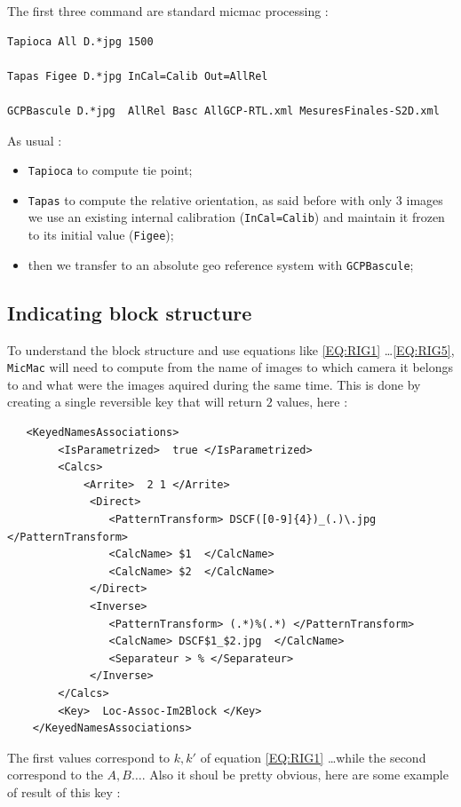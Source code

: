 The first three command are standard micmac processing :

\begin{verbatim}
Tapioca All D.*jpg 1500

Tapas Figee D.*jpg InCal=Calib Out=AllRel

GCPBascule D.*jpg  AllRel Basc AllGCP-RTL.xml MesuresFinales-S2D.xml
\end{verbatim}

As usual :

\begin{itemize}
    \item {\tt Tapioca} to compute tie point;
    \item {\tt Tapas} to compute the relative orientation, as said before with only $3$ images we use an existing internal
          calibration ({\tt InCal=Calib}) and maintain it frozen to its initial value ({\tt Figee});
    \item then we transfer to an absolute geo reference system with {\tt GCPBascule};
\end{itemize}

\subsection{Indicating block structure}

To understand the block structure and use equations like  \ref{EQ:RIG1} \dots \ref{EQ:RIG5}, 
{\tt MicMac} will need to compute from the name of images to which camera it belongs to and 
what were the images aquired during the same time. This is done by creating a single reversible key
that will return $2$ values, here :

\begin{verbatim}
   <KeyedNamesAssociations>
        <IsParametrized>  true </IsParametrized>
        <Calcs>
            <Arrite>  2 1 </Arrite>
             <Direct>
                <PatternTransform> DSCF([0-9]{4})_(.)\.jpg   </PatternTransform>
                <CalcName> $1  </CalcName>
                <CalcName> $2  </CalcName>
             </Direct>
             <Inverse>
                <PatternTransform> (.*)%(.*) </PatternTransform>
                <CalcName> DSCF$1_$2.jpg  </CalcName>
                <Separateur > % </Separateur>
             </Inverse>
        </Calcs>
        <Key>  Loc-Assoc-Im2Block </Key>
    </KeyedNamesAssociations>
\end{verbatim}

The first values correspond to $k,k'$ of equation   \ref{EQ:RIG1} \dots while the second correspond
to the $A,B \dots$.  Also it shoul be pretty obvious, here are some example of result of this key :


